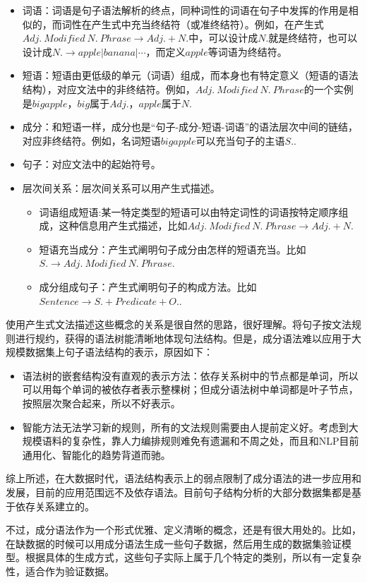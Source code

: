 \begin{itemize}
    \item 词语：词语是句子语法解析的终点，同种词性的词语在句子中发挥的作用是相似的，而词性在产生式中充当终结符（或准终结符）。例如，在产生式$Adj. \ Modified \ N. \ Phrase \to Adj.+N.$中，可以设计成$N.$就是终结符，也可以设计成$N.\to apple | banana | \cdots$，而定义$apple$等词语为终结符。
    \item 短语：短语由更低级的单元（词语）组成，而本身也有特定意义（短语的语法结构），对应文法中的非终结符。例如，$Adj. \ Modified \ N. \ Phrase$的一个实例是$big apple$，$big$属于$Adj.$，$apple$属于$N.$
    \item 成分：和短语一样，成分也是“句子-成分-短语-词语”的语法层次中间的链结，对应非终结符。例如，名词短语$big apple$可以充当句子的主语$S.$.
    \item 句子：对应文法中的起始符号。
    \item 层次间关系：层次间关系可以用产生式描述。
    \begin{itemize}
        \item 词语组成短语:某一特定类型的短语可以由特定词性的词语按特定顺序组成，这种信息用产生式描述，比如$Adj. \ Modified \ N. \ Phrase \to Adj.+N.$
        \item 短语充当成分：产生式阐明句子成分由怎样的短语充当。比如$S. \to Adj. \ Modified \ N. \ Phrase$.
        \item 成分组成句子：产生式阐明句子的构成方法。比如$Sentence \to S. + Predicate + O.$.
    \end{itemize}
\end{itemize}

使用产生式文法描述这些概念的关系是很自然的思路，很好理解。将句子按文法规则进行规约，获得的语法树能清晰地体现句法结构。但是，成分语法难以应用于大规模数据集上句子语法结构的表示，原因如下：
\begin{itemize}
\item 语法树的嵌套结构没有直观的表示方法：依存关系树中的节点都是单词，所以可以用每个单词的被依存者表示整棵树；但成分语法树中单词都是叶子节点，按照层次聚合起来，所以不好表示。
\item 智能方法无法学习新的规则，所有的文法规则需要由人提前定义好。考虑到大规模语料的复杂性，靠人力编排规则难免有遗漏和不周之处，而且和NLP目前通用化、智能化的趋势背道而驰。
\end{itemize}
综上所述，在大数据时代，语法结构表示上的弱点限制了成分语法的进一步应用和发展，目前的应用范围远不及依存语法。目前句子结构分析的大部分数据集都是基于依存关系建立的。

不过，成分语法作为一个形式优雅、定义清晰的概念，还是有很大用处的。比如，在缺数据的时候可以用成分语法生成一些句子数据，然后用生成的数据集验证模型。根据具体的生成方式，这些句子实际上属于几个特定的类别，所以有一定复杂性，适合作为验证数据。


